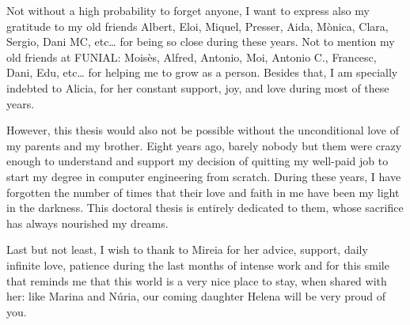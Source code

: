 Not without a high probability to forget anyone, I want to express also my gratitude to my old friends Albert, Eloi, Miquel, Presser, Aida, Mònica, Clara, Sergio, Dani MC, etc… for being so close during these years.  Not to mention my old friends at FUNIAL: Moisès, Alfred, Antonio, Moi, Antonio C., Francesc, Dani, Edu, etc… for helping me to grow as a person.  Besides that, I am specially indebted to Alicia, for her constant support, joy, and love during most of these years.   

However, this thesis would also not be possible without the unconditional love of my parents and my brother. Eight years ago, barely nobody but them were crazy enough to understand and support my decision of quitting my well-paid job to start my degree in computer engineering from scratch. During these years, I have forgotten the number of times that their love and faith in me have been my light in the darkness. This doctoral thesis is entirely dedicated to them, whose sacrifice has always nourished my dreams.

Last but not least, I wish to thank to Mireia for her advice, support, daily infinite love, patience during the last months of intense work and for this smile that reminds me that this world is a very nice place to stay, when shared with her: like Marina and Núria, our coming daughter Helena will be very proud of you.  

